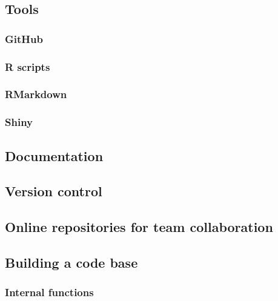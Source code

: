 \documentclass[
]{book}
\begin{document}
\hypertarget{tools}{%
\subsection{Tools}\label{tools}}

\hypertarget{github-1}{%
\subsubsection{GitHub}\label{github-1}}

\hypertarget{r-scripts}{%
\subsubsection{R scripts}\label{r-scripts}}

\hypertarget{rmarkdown}{%
\subsubsection{RMarkdown}\label{rmarkdown}}

\hypertarget{shiny}{%
\subsubsection{Shiny}\label{shiny}}

\hypertarget{documentation}{%
\subsection{Documentation}\label{documentation}}

\hypertarget{version-control}{%
\subsection{Version control}\label{version-control}}

\hypertarget{online-repositories-for-team-collaboration}{%
\subsection{Online repositories for team collaboration}\label{online-repositories-for-team-collaboration}}

\hypertarget{building-a-code-base}{%
\subsection{Building a code base}\label{building-a-code-base}}

\hypertarget{internal-functions}{%
\subsubsection{Internal functions}\label{internal-functions}}
\end{document}
